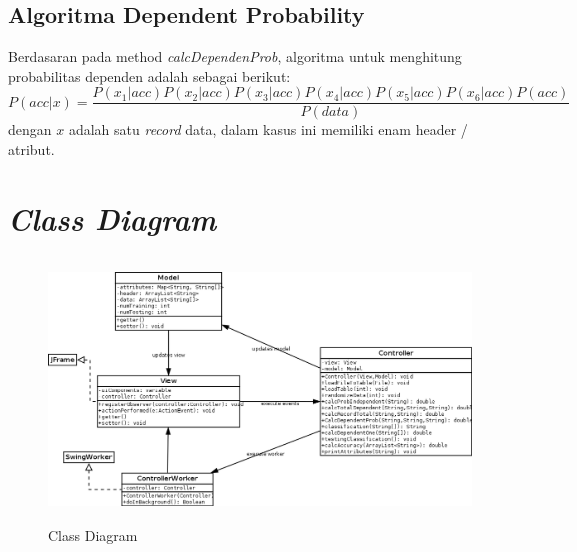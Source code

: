\documentclass[11pt,a4paper]{report}
\begin{document}
	\subsection*{Algoritma Dependent Probability}
	Berdasaran pada method \emph{calcDependenProb}, algoritma untuk menghitung probabilitas dependen adalah sebagai berikut:
	\[ P(acc|x)=\frac{P(x_{1}|acc)P(x_{2}|acc)P(x_{3}|acc)P(x_{4}|acc)P(x_{5}|acc)P(x_{6}|acc)P(acc)}{P(data)} \]
	dengan $x$ adalah satu \emph{record} data, dalam kasus ini memiliki enam header / atribut. 
	\newpage
	
	\section*{\textit{Class Diagram}}
	\begin{figure}[h]
	\centering
	\includegraphics[width=13cm, height=7cm]{class}
	\caption{Class Diagram}
	\label{fig:class}
	\end{figure}
	
\end{document}
